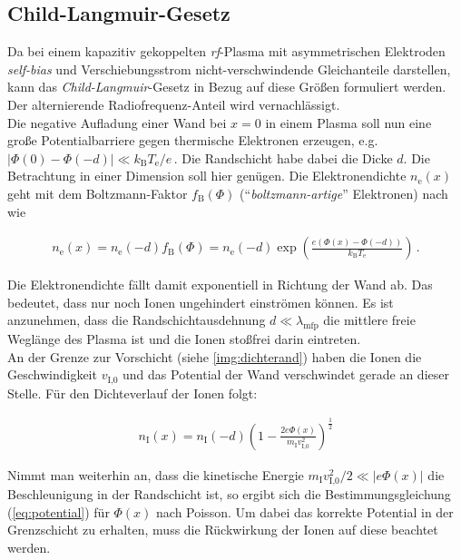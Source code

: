 \documentclass[numbers=noenddot,a4paper,notitlepage,twoside,BCOR15mm]{scrbook}
\newcommand{\ix}[1]{_\text{#1}}
\newcommand{\tilt}[1]{\textit{#1}}
\begin{document}
		\subsection{Child-Langmuir-Gesetz} \label{subsub:childlang}

		Da bei einem kapazitiv gekoppelten \tilt{rf}-Plasma mit asymmetrischen Elektroden \tilt{self-bias} und Verschiebungsstrom nicht-verschwindende Gleichanteile darstellen, kann das \tilt{Child-Langmuir}-Gesetz in Bezug auf diese Größen formuliert werden. Der alternierende Radiofrequenz-Anteil wird vernachlässigt.\\
		Die negative Aufladung einer Wand bei $x=0$ in einem Plasma soll nun eine große Potentialbarriere gegen thermische Elektronen erzeugen, e.g. $|\Phi\left(0\right)-\Phi\left(-d\right)|\ll k\ix{B}T\ix{e}/e\,$. Die Randschicht habe dabei die Dicke $d$. Die Betrachtung in einer Dimension soll hier genügen. Die Elektronendichte $n\ix{e}\left(x\right)$ geht mit dem Boltzmann-Faktor $f\ix{B}\left(\Phi\right)$ ("`\tilt{boltzmann-artige}"' Elektronen) nach \cite{Piel10} wie

			\begin{align}
				n\ix{e}\left(x\right)=n\ix{e}\left(-d\right)f\ix{B}\left(\Phi\right)=n\ix{e}\left(-d\right)\exp\left(\frac{e\left(\Phi\left(x\right)-\Phi\left(-d\right)\right)}{k\ix{B}T\ix{e}}\right) \, . \label{eq:randschichtdichte}
			\end{align}

		Die Elektronendichte fällt damit exponentiell in Richtung der Wand ab. Das bedeutet, dass nur noch Ionen ungehindert einströmen können. Es ist anzunehmen, dass die Randschichtausdehnung $d\ll\lambda\ix{mfp}$ die mittlere freie Weglänge des Plasma ist und die Ionen stoßfrei darin eintreten.\\
		An der Grenze zur Vorschicht (siehe \autoref{img:dichterand}) haben die Ionen die Geschwindigkeit $v\ix{I,0}$ und das Potential der Wand verschwindet gerade an dieser Stelle. Für den Dichteverlauf der Ionen folgt:

			\begin{align}
				n\ix{I}\left(x\right)=n\ix{I}\left(-d\right)\left(1-\frac{2e\Phi\left(x\right)}{m\ix{I}v\ix{I,0}^2}\right)^{\frac{1}{2}}
			\end{align}

		Nimmt man weiterhin an, dass die kinetische Energie $m\ix{I}v\ix{I,0}^2/2\ll |e\Phi\left(x\right)|$ die Beschleunigung in der Randschicht ist,  so ergibt sich die Bestimmungsgleichung (\ref{eq:potential}) für $\Phi\left(x\right)$ nach Poisson. Um dabei das korrekte Potential in der Grenzschicht zu erhalten, muss die Rückwirkung der Ionen auf diese beachtet werden.
\end{document}
